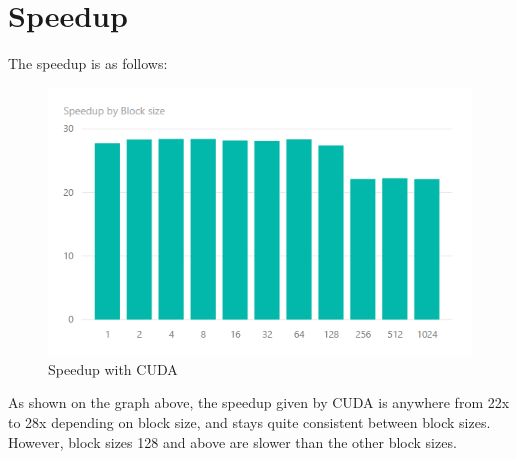\documentclass[12pt]{article}
\begin{document}

\section{Speedup}

The speedup is as follows:

\begin{figure}[h]
    \caption{Speedup with CUDA}
    \includegraphics{pics/lw3.png}
\end{figure}

As shown on the graph above, the speedup given by CUDA is anywhere from 22x to 28x depending on block size, and stays quite consistent
between block sizes.
However, block sizes 128 and above are slower than the other block sizes.

\end{document}
